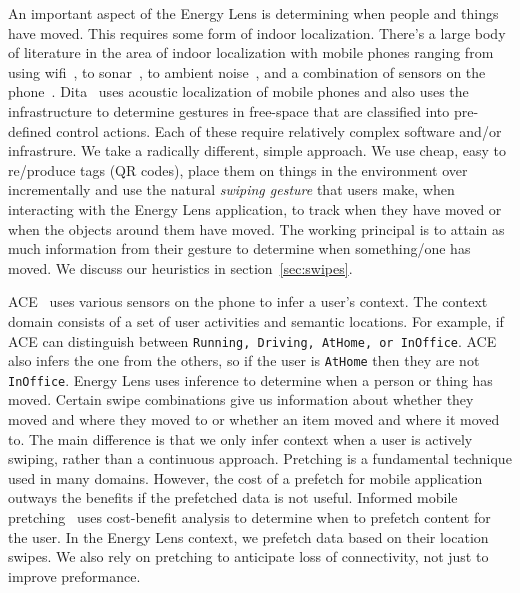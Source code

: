 An important aspect of the Energy Lens is determining when people and things have moved.  This requires some form 
of indoor localization.  There's a large body of literature in the area of indoor localization with mobile phones ranging from 
using wifi~\cite{radar}, to sonar~\cite{cricket}, to ambient noise~\cite{abs}, and a combination of sensors on the 
phone~\cite{surroundsense, darwinphone}.  Dita~\cite{dita} uses acoustic localization of mobile phones and also uses the infrastructure 
to determine gestures in free-space that are classified into pre-defined control actions.  Each of these require relatively complex 
software and/or infrastrure.  
We take a radically different, simple approach.  We use cheap, easy to re/produce tags (QR codes), place them on things in the 
environment over incrementally and use the natural \emph{swiping gesture} that users make, when interacting with the Energy Lens 
application, to track when they have moved or when the objects around them have moved.  The working principal is to attain as much 
information from their gesture to determine when something/one has moved.  We discuss our heuristics in section~\ref{sec:swipes}.

ACE~\cite{ACE} uses various sensors on the phone to infer a user's context.  The context domain consists of a set of user activities
and semantic locations.  For example, if ACE can distinguish between {\tt Running, Driving, AtHome, or InOffice}.  ACE also infers 
the one from the others, so if the user is {\tt AtHome} then they are not {\tt InOffice}.  Energy Lens uses inference to determine
when a person or thing has moved.  Certain swipe combinations give us information about whether they moved and where they moved to or
whether an item moved and where it moved to.  The main difference is that we only infer context when a user is actively swiping, rather
than a continuous approach.  Pretching is a fundamental technique used in many domains.  However, the cost of a prefetch for mobile
application outways the benefits if the prefetched data is not useful.  Informed mobile pretching~\cite{IMP} uses cost-benefit analysis 
to determine when to prefetch content for the user.  In the Energy Lens context, we prefetch data based on their location swipes.
We also rely on pretching to anticipate loss of connectivity, not just to improve preformance.

